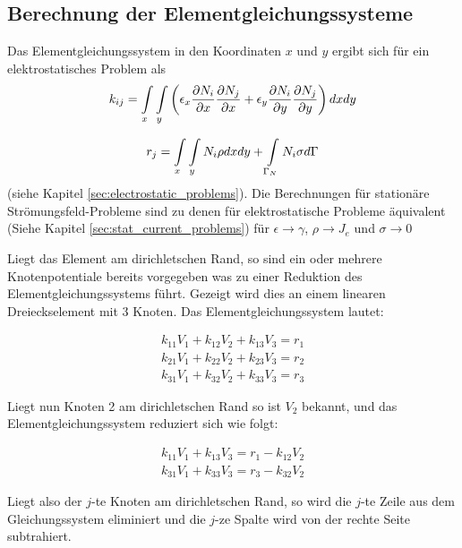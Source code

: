 \subsection{Berechnung der Elementgleichungssysteme}
\label{sec:equation_system_calculation}

Das Elementgleichungssystem in den Koordinaten $x$ und $y$ ergibt sich für ein elektrostatisches Problem als
\begin{equation}
\label{eq:k_ij_e_static_2}
k_{ij} = \int\displaylimits_{x} \int\displaylimits_{y} \left(\epsilon_x \frac{\partial N_i}{\partial x}\frac{\partial N_j}{\partial x} +  \epsilon_y\frac{\partial N_i}{\partial y}\frac{\partial N_j}{\partial y}\right)dx dy
\end{equation}

\begin{equation}
\label{eq:right_side_e_static_2}
r_j = \int\displaylimits_{x} \int\displaylimits_{y} N_i \rho dx dy + \int\displaylimits_{\Gamma_N} N_i\sigma d\Gamma
\end{equation} 
(siehe Kapitel \ref{sec:electrostatic_problems}). Die Berechnungen für stationäre Strömungsfeld-Probleme sind zu denen für elektrostatische Probleme äquivalent (Siehe Kapitel \ref{sec:stat_current_problems}) für $\epsilon \rightarrow \gamma$, $\rho \rightarrow J_e$ und $\sigma \rightarrow 0$\newline

Liegt das Element am dirichletschen Rand, so sind ein oder mehrere Knotenpotentiale bereits vorgegeben was zu einer Reduktion des Elementgleichungssystems führt. Gezeigt wird dies an einem linearen Dreieckselement mit 3 Knoten. Das Elementgleichungssystem lautet:

\begin{align*}
	k_{11} V_1 + k_{12} V_2 + k_{13} V_3 = r_1\\
	k_{21} V_1 + k_{22} V_2 + k_{23} V_3 = r_2\\
	k_{31} V_1 + k_{32} V_2 + k_{33} V_3 = r_3
\end{align*}

Liegt nun Knoten 2 am dirichletschen Rand so ist $V_2$ bekannt, und das Elementgleichungssystem reduziert sich wie folgt:

 \begin{align*}
 k_{11} V_1  + k_{13} V_3 = r_1 - k_{12} V_2\\
 k_{31} V_1  + k_{33} V_3 = r_3 - k_{32} V_2
 \end{align*}
 
 Liegt also der $j$-te Knoten am dirichletschen Rand, so wird die $j$-te Zeile aus dem Gleichungssystem eliminiert und die $j$-ze Spalte wird von der rechte Seite subtrahiert.


